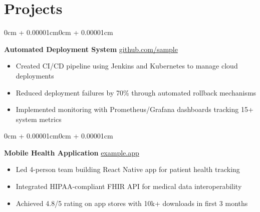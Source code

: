 \documentclass[10pt, letterpaper]{article}
\newenvironment{highlights}{
    \begin{itemize}[
        topsep=0.10 cm,
        parsep=0.10 cm,
        partopsep=0pt,
        itemsep=0pt,
        leftmargin=0 cm + 10pt
    ]
}{\end{itemize}}
\newenvironment{onecolentry}{
    \begin{adjustwidth}{0cm + 0.00001cm}{0cm + 0.00001cm}
}{\end{adjustwidth}}
\begin{document}
    \section{Projects}
    \vspace{-12pt}
    \hrulefill
    \begin{onecolentry}
    {\normalsize \textbf{Automated Deployment System}} \hfill {\href{https://github.com/sample}{github.com/sample}}\\
    \begin{highlights}
        \item Created CI/CD pipeline using Jenkins and Kubernetes to manage cloud deployments
        \item Reduced deployment failures by 70\% through automated rollback mechanisms
        \item Implemented monitoring with Prometheus/Grafana dashboards tracking 15+ system metrics
    \end{highlights}
    \end{onecolentry}
    
    \begin{onecolentry}
    {\normalsize \textbf{Mobile Health Application}} \hfill {\href{https://example.app}{example.app}}\\
    \begin{highlights}
        \item Led 4-person team building React Native app for patient health tracking
        \item Integrated HIPAA-compliant FHIR API for medical data interoperability
        \item Achieved 4.8/5 rating on app stores with 10k+ downloads in first 3 months
    \end{highlights}
    \end{onecolentry}
    
\end{document}
